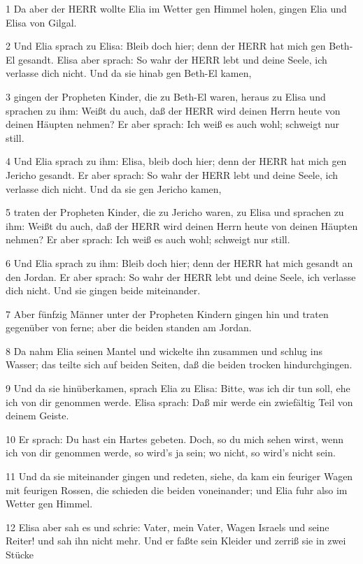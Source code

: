 \par 1 Da aber der HERR wollte Elia im Wetter gen Himmel holen, gingen Elia und Elisa von Gilgal.
\par 2 Und Elia sprach zu Elisa: Bleib doch hier; denn der HERR hat mich gen Beth-El gesandt. Elisa aber sprach: So wahr der HERR lebt und deine Seele, ich verlasse dich nicht. Und da sie hinab gen Beth-El kamen,
\par 3 gingen der Propheten Kinder, die zu Beth-El waren, heraus zu Elisa und sprachen zu ihm: Weißt du auch, daß der HERR wird deinen Herrn heute von deinen Häupten nehmen? Er aber sprach: Ich weiß es auch wohl; schweigt nur still.
\par 4 Und Elia sprach zu ihm: Elisa, bleib doch hier; denn der HERR hat mich gen Jericho gesandt. Er aber sprach: So wahr der HERR lebt und deine Seele, ich verlasse dich nicht. Und da sie gen Jericho kamen,
\par 5 traten der Propheten Kinder, die zu Jericho waren, zu Elisa und sprachen zu ihm: Weißt du auch, daß der HERR wird deinen Herrn heute von deinen Häupten nehmen? Er aber sprach: Ich weiß es auch wohl; schweigt nur still.
\par 6 Und Elia sprach zu ihm: Bleib doch hier; denn der HERR hat mich gesandt an den Jordan. Er aber sprach: So wahr der HERR lebt und deine Seele, ich verlasse dich nicht. Und sie gingen beide miteinander.
\par 7 Aber fünfzig Männer unter der Propheten Kindern gingen hin und traten gegenüber von ferne; aber die beiden standen am Jordan.
\par 8 Da nahm Elia seinen Mantel und wickelte ihn zusammen und schlug ins Wasser; das teilte sich auf beiden Seiten, daß die beiden trocken hindurchgingen.
\par 9 Und da sie hinüberkamen, sprach Elia zu Elisa: Bitte, was ich dir tun soll, ehe ich von dir genommen werde. Elisa sprach: Daß mir werde ein zwiefältig Teil von deinem Geiste.
\par 10 Er sprach: Du hast ein Hartes gebeten. Doch, so du mich sehen wirst, wenn ich von dir genommen werde, so wird's ja sein; wo nicht, so wird's nicht sein.
\par 11 Und da sie miteinander gingen und redeten, siehe, da kam ein feuriger Wagen mit feurigen Rossen, die schieden die beiden voneinander; und Elia fuhr also im Wetter gen Himmel.
\par 12 Elisa aber sah es und schrie: Vater, mein Vater, Wagen Israels und seine Reiter! und sah ihn nicht mehr. Und er faßte sein Kleider und zerriß sie in zwei Stücke
